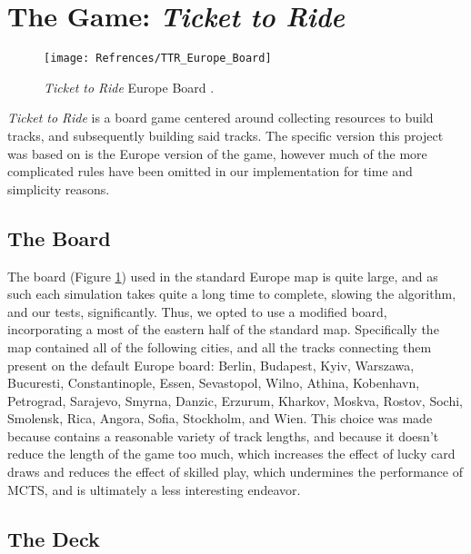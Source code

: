 \documentclass[11pt, letterpaper, twoside]{article}
\begin{document}
\section{The Game: \textit{\textit{Ticket to Ride}}}

\begin{figure}
\begin{center}
  \texttt{[image: Refrences/TTR\_Europe\_Board]}
  \caption{\textit{Ticket to Ride} Europe Board \cite{ttr_ai}.}
  \label{fig:ttr_europe}
 \end{center}
\end{figure}

\textit{Ticket to Ride} \cite{TTR} is a board game centered around collecting resources to build tracks, and subsequently building said tracks. The specific version this project was based on is the Europe version of the game, however much of the more complicated rules have been omitted in our implementation for time and simplicity reasons. 

\subsection{The Board}

The board (Figure \ref{fig:ttr_europe}) used in the standard Europe map is quite large, and as such each simulation takes quite a long time to complete, slowing the algorithm, and our tests, significantly. Thus, we opted to use a modified board, incorporating a most of the eastern half of the standard map. Specifically the map contained all of the following cities, and all the tracks connecting them present on the default Europe board: Berlin, Budapest, Kyiv, Warszawa, Bucuresti, Constantinople, Essen, Sevastopol, Wilno, Athina, Kobenhavn, Petrograd, Sarajevo, Smyrna, Danzic, Erzurum, Kharkov, Moskva, Rostov, Sochi, Smolensk, Rica, Angora, Sofia, Stockholm, and Wien. This choice was made because contains a reasonable variety of track lengths, and because it doesn't reduce the length of the game too much, which increases the effect of lucky card draws and reduces the effect of skilled play, which undermines the performance of MCTS, and is ultimately a less interesting endeavor.

\subsection{The Deck}
\end{document}
